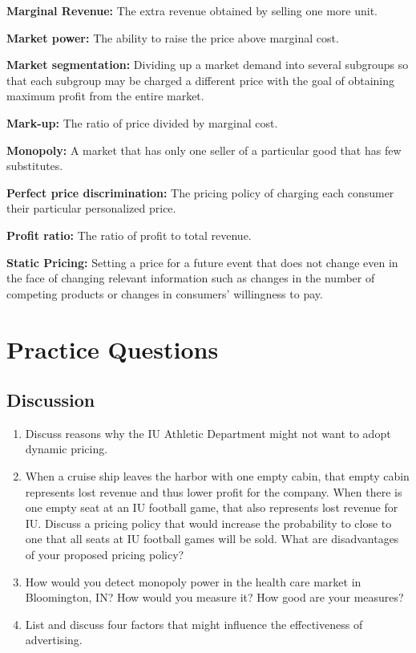 \documentclass[
]{book}
\providecommand{\tightlist}{%
  \setlength{\itemsep}{0pt}\setlength{\parskip}{0pt}}
\begin{document}
\textbf{Marginal Revenue:} The extra revenue obtained by selling one more unit.

\textbf{Market power:} The ability to raise the price above marginal cost.

\textbf{Market segmentation:} Dividing up a market demand into several subgroups so that each subgroup may be charged a different price with the goal of obtaining maximum profit from the entire market.

\textbf{Mark-up:} The ratio of price divided by marginal cost.

\textbf{Monopoly:} A market that has only one seller of a particular good that has few substitutes.

\textbf{Perfect price discrimination:} The pricing policy of charging each consumer their particular personalized price.

\textbf{Profit ratio:} The ratio of profit to total revenue.

\textbf{Static Pricing:} Setting a price for a future event that does not change even in the face of changing relevant information such as changes in the number of competing products or changes in consumers' willingness to pay.

\hypertarget{practice-questions-6}{%
\section{Practice Questions}\label{practice-questions-6}}

\hypertarget{discussion-6}{%
\subsection{Discussion}\label{discussion-6}}

\begin{enumerate}
\def\labelenumi{\arabic{enumi}.}
\tightlist
\item
  Discuss reasons why the IU Athletic Department might not want to adopt dynamic pricing.
\item
  When a cruise ship leaves the harbor with one empty cabin, that empty cabin represents lost revenue and thus lower profit for the company. When there is one empty seat at an IU football game, that also represents lost revenue for IU. Discuss a pricing policy that would increase the probability to close to one that all seats at IU football games will be sold. What are disadvantages of your proposed pricing policy?
\item
  How would you detect monopoly power in the health care market in Bloomington, IN? How would you measure it? How good are your measures?
\item
  List and discuss four factors that might influence the effectiveness of advertising.
\end{enumerate}
\end{document}
